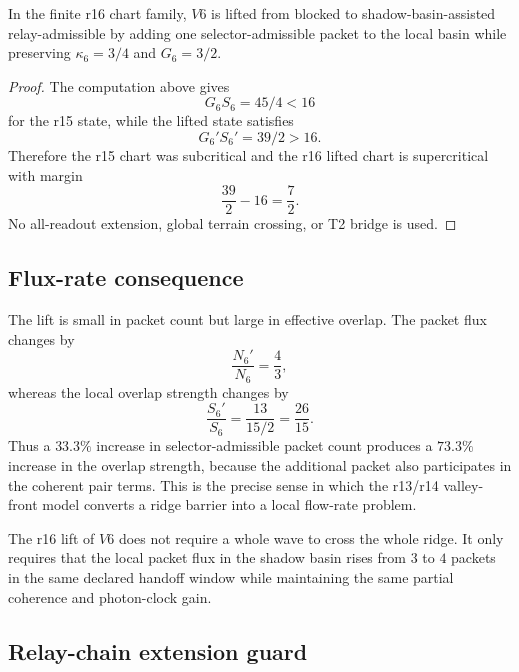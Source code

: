 \begin{lemma}
\label{lem:v470-r16-one-packet-shadow-basin-lift-v6}
In the finite r16 chart family, \(V6\) is lifted from blocked to
shadow-basin-assisted relay-admissible by adding one selector-admissible packet
to the local basin while preserving \(\kappa_6=3/4\) and \(G_6=3/2\).
\end{lemma}

\begin{proof}
The computation above gives
\[
G_6S_6=45/4<16
\]
for the r15 state, while the lifted state satisfies
\[
G_6'S_6'=39/2>16.
\]
Therefore the r15 chart was subcritical and the r16 lifted chart is supercritical
with margin
\[
\frac{39}{2}-16=\frac72.
\]
No all-readout extension, global terrain crossing, or T2 bridge is used.
\end{proof}

\subsection{Flux-rate consequence}
\label{subsec:v470-r16-flux-rate-consequence}

The lift is small in packet count but large in effective overlap.  The packet
flux changes by
\[
\frac{N_6'}{N_6}=\frac43,
\]
whereas the local overlap strength changes by
\[
\frac{S_6'}{S_6}
=
\frac{13}{15/2}
=
\frac{26}{15}.
\]
Thus a \(33.3\%\) increase in selector-admissible packet count produces a
\(73.3\%\) increase in the overlap strength, because the additional packet also
participates in the coherent pair terms.  This is the precise sense in which the
r13/r14 valley-front model converts a ridge barrier into a local flow-rate
problem.

\begin{corollary}
\label{cor:v470-r16-local-relay-without-global-wave-crossing}
The r16 lift of \(V6\) does not require a whole wave to cross the whole ridge.
It only requires that the local packet flux in the shadow basin rises from
\(3\) to \(4\) packets in the same declared handoff window while maintaining the
same partial coherence and photon-clock gain.
\end{corollary}

\subsection{Relay-chain extension guard}
\label{subsec:v470-r16-relay-chain-extension-guard}

